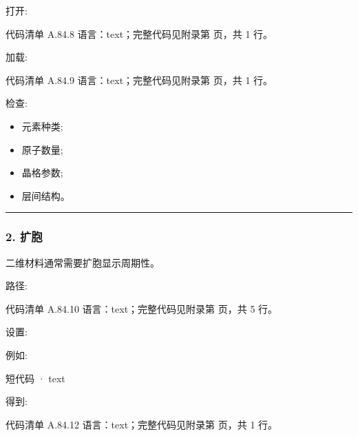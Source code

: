\documentclass[lang=cn,scheme=chinese,color=blue,device=normal,toc=onecol,math=cm]{elegantbook}
\begin{document}
打开:\par


\begin{codeindexbox}{代码清单 A.84.8}
语言：text；完整代码见附录第 \pageref{code:84:8} 页，共 1 行。
\end{codeindexbox}


加载:\par


\begin{codeindexbox}{代码清单 A.84.9}
语言：text；完整代码见附录第 \pageref{code:84:9} 页，共 1 行。
\end{codeindexbox}


检查:\par


\begin{itemize}
\item 元素种类;
\item 原子数量;
\item 晶格参数;
\item 层间结构。
\end{itemize}


\medskip\hrule\medskip


\subsubsection{2. 扩胞}


二维材料通常需要扩胞显示周期性。\par


路径:\par


\begin{codeindexbox}{代码清单 A.84.10}
语言：text；完整代码见附录第 \pageref{code:84:10} 页，共 5 行。
\end{codeindexbox}


设置:\par


例如:\par


\begin{inlinecodebox}{短代码 · text}
\end{inlinecodebox}


得到:\par


\begin{codeindexbox}{代码清单 A.84.12}
语言：text；完整代码见附录第 \pageref{code:84:12} 页，共 1 行。
\end{codeindexbox}
\end{document}
